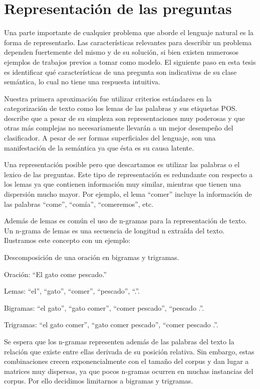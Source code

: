 \chapter{Representación de las preguntas}\label{capitulo-features}

Una parte importante de cualquier problema que aborde el lenguaje natural es la forma de representarlo. Las características relevantes para describir un problema dependen fuertemente del mismo y de su solución, si bien existen numerosos ejemplos de trabajos previos a tomar como modelo. El siguiente paso en esta tesis es identificar qué características de una pregunta son indicativas de su clase semántica, lo cual no tiene una respuesta intuitiva.

Nuestra primera aproximación fue utilizar criterios estándares en la categorización de texto como los lemas de las palabras y sus etiquetas POS. \citet{Sebastiani-text-categorization} describe que a pesar de su simpleza son representaciones muy poderosas y que otras más complejas no necesariamente llevarán a un mejor desempeño del clasificador. A pesar de ser formas superficiales del lenguaje, son una manifestación de la semántica ya que ésta es su causa latente.

Una representación posible pero que descartamos es utilizar las palabras o el lexico de las preguntas. Este tipo de representación es redundante con respecto a los lemas ya que contienen información muy similar, mientras que tienen una dispersión mucho mayor. Por ejemplo, el lema ``comer'' incluye la información de las palabras ``come'', ``comía'', ``comeremos'', etc.

Además de lemas es común el uso de n-gramas para la representación de texto. Un n-grama de lemas es una secuencia de longitud n extraída del texto. Ilustramos este concepto con un ejemplo:

\begin{example} Descomposición de una oración en bigramas y trigramas.

Oración: ``El gato come pescado.''

Lemas: ``el'', ``gato'', ``comer'', ``pescado'', ``.''.

Bigramas: ``el gato'', ``gato comer'', ``comer pescado'', ``pescado .''.

Trigramas: ``el gato comer'', ``gato comer pescado'', ``comer pescado .''.

\end{example}

Se espera que los n-gramas representen además de las palabras del texto la relación que existe entre ellas derivada de su posición relativa. Sin embargo, estas combinaciones crecen exponencialmente con el tamaño del corpus y dan lugar a matrices muy dispersas, ya que pocos n-gramas ocurren en muchas instancias del corpus. Por ello decidimos limitarnos a bigramas y trigramas.

